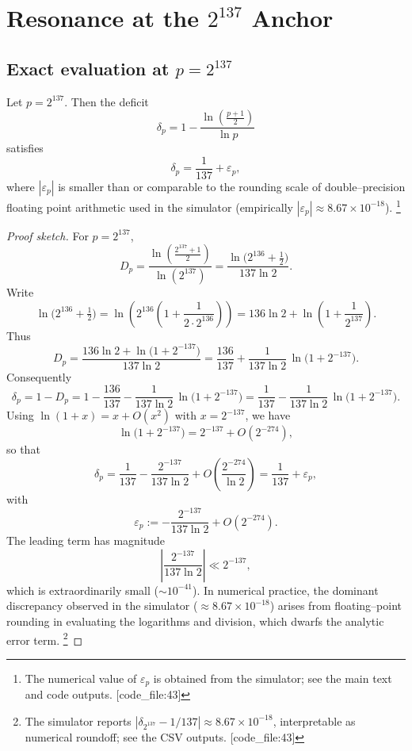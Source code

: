 \documentclass[11pt]{article}
\begin{document}
\section{Resonance at the \(2^{137}\) Anchor}

\subsection{Exact evaluation at \(p = 2^{137}\)}

\begin{proposition}
Let \(p = 2^{137}\). Then the deficit
\[
  \delta_p = 1 - \frac{\ln\left(\frac{p+1}{2}\right)}{\ln p}
\]
satisfies
\[
  \delta_p = \frac{1}{137} + \varepsilon_p,
\]
where \(|\varepsilon_p|\) is smaller than or comparable to the rounding scale of double–precision floating point arithmetic used in the simulator (empirically \(|\varepsilon_p|\approx 8.67\times 10^{-18}\)).%
\footnote{The numerical value of \(\varepsilon_p\) is obtained from the simulator; see the main text and code outputs. [code\_file:43]} 
\end{proposition}

\begin{proof}[Proof sketch]
For \(p = 2^{137}\),
\[
  D_p = \frac{\ln\left(\frac{2^{137}+1}{2}\right)}{\ln(2^{137})}
      = \frac{\ln\bigl(2^{136} + \tfrac{1}{2}\bigr)}{137\ln 2}.
\]
Write
\[
  \ln\bigl(2^{136} + \tfrac{1}{2}\bigr)
    = \ln\left(2^{136}\left(1 + \frac{1}{2\cdot 2^{136}}\right)\right)
    = 136\ln 2 + \ln\left(1 + \frac{1}{2^{137}}\right).
\]
Thus
\[
  D_p = \frac{136\ln 2 + \ln\bigl(1 + 2^{-137}\bigr)}{137\ln 2}
      = \frac{136}{137} + \frac{1}{137\ln 2}\,\ln\bigl(1 + 2^{-137}\bigr).
\]
Consequently
\[
  \delta_p 
    = 1 - D_p
    = 1 - \frac{136}{137} - \frac{1}{137\ln 2}\,\ln\bigl(1 + 2^{-137}\bigr)
    = \frac{1}{137} - \frac{1}{137\ln 2}\,\ln\bigl(1 + 2^{-137}\bigr).
\]
Using \(\ln(1+x) = x + O(x^2)\) with \(x = 2^{-137}\), we have
\[
  \ln\bigl(1 + 2^{-137}\bigr) = 2^{-137} + O(2^{-274}),
\]
so that
\[
  \delta_p
    = \frac{1}{137} - \frac{2^{-137}}{137\ln 2} + O\!\left(\frac{2^{-274}}{\ln 2}\right)
    = \frac{1}{137} + \varepsilon_p,
\]
with
\[
  \varepsilon_p := - \frac{2^{-137}}{137\ln 2} + O(2^{-274}).
\]
The leading term has magnitude
\[
  \left|\frac{2^{-137}}{137\ln 2}\right| \ll 2^{-137},
\]
which is extraordinarily small (\(\sim 10^{-41}\)). In numerical practice, the dominant discrepancy observed in the simulator (\(\approx 8.67\times 10^{-18}\)) arises from floating–point rounding in evaluating the logarithms and division, which dwarfs the analytic error term.%
\footnote{The simulator reports \(|\delta_{2^{137}} - 1/137| \approx 8.67\times 10^{-18}\), interpretable as numerical roundoff; see the CSV outputs. [code\_file:43]} 
\end{proof}
\end{document}

